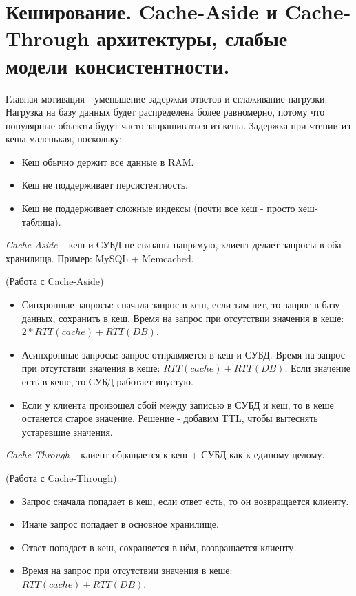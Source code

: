 \section{Кеширование. Cache-Aside и Cache-Through архитектуры, слабые модели консистентности.}

Главная мотивация - уменьшение задержки ответов и сглаживание нагрузки.
Нагрузка на базу данных будет распределена более равномерно, потому что популярные объекты будут часто запрашиваться из кеша.
Задержка при чтении из кеша маленькая, поскольку:
\begin{itemize}
    \item Кеш обычно держит все данные в RAM.
    \item Кеш не поддерживает персистентность.
    \item Кеш не поддерживает сложные индексы (почти все кеш - просто хеш-таблица).
\end{itemize}

\begin{definition}
    \textit{Cache-Aside} -- кеш и СУБД не связаны напрямую, клиент делает запросы в оба хранилища. Пример: MySQL + Memcached.
\end{definition}

\begin{algorithm}(Работа с Cache-Aside)
    \begin{itemize}
        \item Синхронные запросы: сначала запрос в кеш, если там нет, то запрос в базу данных, сохранить в кеш.
            Время на запрос при отсутствии значения в кеше: $2 * RTT(cache) + RTT(DB)$.
        \item Асинхронные запросы: запрос отправляется в кеш и СУБД.
            Время на запрос при отсутствии значения в кеше: $RTT(cache) + RTT(DB)$.
            Если значение есть в кеше, то СУБД работает впустую.
        \item Если у клиента произошел сбой между записью в СУБД и кеш, то в кеше останется старое значение.
            Решение - добавим TTL, чтобы вытеснять устаревшие значения.
    \end{itemize}
\end{algorithm}

\begin{definition}
    \textit{Cache-Through} -- клиент обращается к кеш + СУБД как к единому целому.
\end{definition}

\begin{algorithm}(Работа с Cache-Through)
    \begin{itemize}
        \item Запрос сначала попадает в кеш, если ответ есть, то он возвращается клиенту.
        \item Иначе запрос попадает в основное хранилище.
        \item Ответ попадает в кеш, сохраняется в нём, возвращается клиенту.
        \item Время на запрос при отсутствии значения в кеше: $RTT(cache) + RTT(DB)$.
    \end{itemize}
\end{algorithm}

